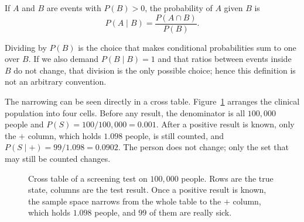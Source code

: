 

\begin{definisi}
If $A$ and $B$ are events with $P(B)>0$, the probability of $A$ given $B$ is
\[
P(A\mid B)=\frac{P(A\cap B)}{P(B)}.
\]
\end{definisi}

Dividing by $P(B)$ is the choice that makes conditional probabilities sum to one over $B$.
If we also demand $P(B\mid B)=1$ and that ratios between events inside $B$ do not change,
that division is the only possible choice; hence this definition is not an arbitrary
convention.

The narrowing can be seen directly in a cross table. Figure~\ref{fig:silang} arranges the
clinical population into four cells. Before any result, the denominator is all $100{,}000$
people and $P(S)=100/100{,}000=0.001$. After a positive result is known, only the $+$
column, which holds $1.098$ people, is still counted, and
$P(S\mid+)=99/1.098=0.0902$. The person does not change; only the set that may still be
counted changes.

    \begin{figure}[htbp]
\centering
{}
\caption{Cross table of a screening test on $100{,}000$ people. Rows are the true state,
columns are the test result. Once a positive result is known, the sample space narrows
from the whole table to the $+$ column, which holds $1.098$ people, and $99$ of them
are really sick.}
\label{fig:silang}
\end{figure}    


